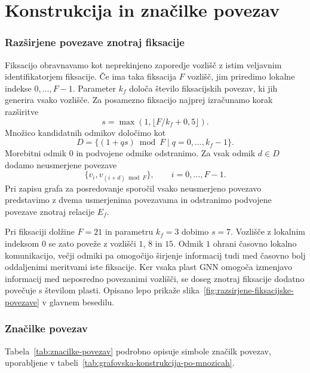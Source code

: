 \section{Konstrukcija in značilke povezav}

\subsubsection*{Razširjene povezave znotraj fiksacije}
\label{app:razsirjene-fiksacijske-povezave}

Fiksacijo obravnavamo kot neprekinjeno zaporedje vozlišč z istim veljavnim identifikatorjem fiksacije.
Če ima taka fiksacija $F$ vozlišč, jim priredimo lokalne indekse $0,\ldots,F-1$.
Parameter $k_f$ določa število fiksacijskih povezav, ki jih generira vsako vozlišče.
Za posamezno fiksacijo najprej izračunamo korak razširitve
\begin{equation}
    s = \max(1, \lfloor F/k_f + 0{,}5 \rfloor).
\end{equation}
Množico kandidatnih odmikov določimo kot
\begin{equation}
    D = \{(1 + q s) \bmod F \mid q = 0,\ldots,k_f-1\}.
\end{equation}
Morebitni odmik $0$ in podvojene odmike odstranimo.
Za vsak odmik $d \in D$ dodamo neusmerjene povezave
\begin{equation}
    \{v_i, v_{(i+d)\bmod F}\},
    \qquad i = 0,\ldots,F-1.
\end{equation}
Pri zapisu grafa za posredovanje sporočil vsako neusmerjeno povezavo predstavimo z dvema usmerjenima povezavama in odstranimo podvojene povezave znotraj relacije $E_f$.

Pri fiksaciji dolžine $F=21$ in parametru $k_f=3$ dobimo $s=7$.
Vozlišče z lokalnim indeksom $0$ se zato poveže z vozlišči $1$, $8$ in $15$.
Odmik $1$ ohrani časovno lokalno komunikacijo, večji odmiki pa omogočijo širjenje informacij tudi med časovno bolj oddaljenimi meritvami iste fiksacije.
Ker vsaka plast GNN omogoča izmenjavo informacij med neposredno povezanimi vozlišči, se doseg znotraj fiksacije dodatno povečuje s številom plasti.
Opisano lepo prikaže slika~\ref{fig:razsirjene-fiksacijske-povezave} v glavnem besedilu.

\subsubsection*{Značilke povezav}

Tabela~\ref{tab:znacilke-povezav} podrobno opisuje simbole značilk povezav, uporabljene v tabeli~\ref{tab:grafovska-konstrukcija-po-mnozicah}.


